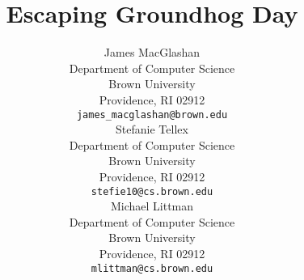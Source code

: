 \documentclass[11pt]{article} %
\title{Escaping Groundhog Day}
\author{
James MacGlashan \\
Department of Computer Science\\
Brown University\\
Providence, RI 02912 \\
\texttt{james\_macglashan@brown.edu} \\
\And
Stefanie Tellex \\
Department of Computer Science\\
Brown University\\
Providence, RI 02912 \\
\texttt{stefie10@cs.brown.edu} \\
\AND
Michael Littman \\
Department of Computer Science\\
Brown University\\
Providence, RI 02912 \\
\texttt{mlittman@cs.brown.edu}
}
\begin{document}
\maketitle

\begin{abstract}






\end{abstract}
\end{document}
